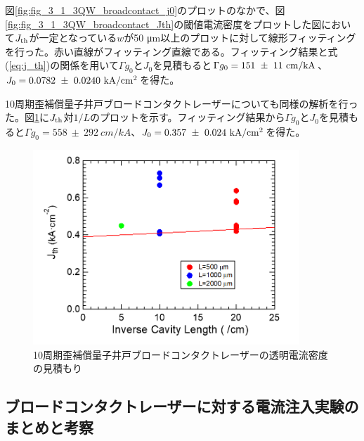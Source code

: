 {図\ref{fig:fig_3_1_3QW_broadcontact_j0}のプロットのなかで、図\ref{fig:fig_3_1_3QW_broadcontact_Jth}の閾値電流密度をプロットした図において$J_{\rm{th}}$が一定となっている$w$が50 \si{\micro\metre}以上のプロットに対して線形フィッティングを行った。赤い直線がフィッティング直線である。フィッティング結果と式(\ref{eq:j_th})の関係を用いて$\Gamma g_{0}$と$J_{0}$を見積もると$\Gamma g_{0}=151 \ \pm \ 11\ \rm{ cm/kA}$、$J_{0}=0.0782 \ \pm \ 0.0240 \ \rm{kA/cm^{2}}$を得た。%


10周期歪補償量子井戸ブロードコンタクトレーザーについても同様の解析を行った。図\ref{fig:fig_3_1_10QW_broadcontact_j0}に$J_{\rm{th}}$対$1/L$のプロットを示す。フィッティング結果から$\Gamma g_{0}$と$J_{0}$を見積もると$\Gamma g_{0}=558\   \pm \ 292\  \si{cm/kA}$、$J_{0}=0.357\  \pm\  0.024\  \rm{kA/cm^{2}}$を得た。
\begin{figure}[t]
	\centering
	\includegraphics[width=10cm]{figure/fig_3_1_10QW_broadcontact_j0.png}
	\caption{10周期歪補償量子井戸ブロードコンタクトレーザーの透明電流密度の見積もり}
	\label{fig:fig_3_1_10QW_broadcontact_j0}
\end{figure}
\newpage
\subsection{ブロードコンタクトレーザーに対する電流注入実験のまとめと考察}

}
